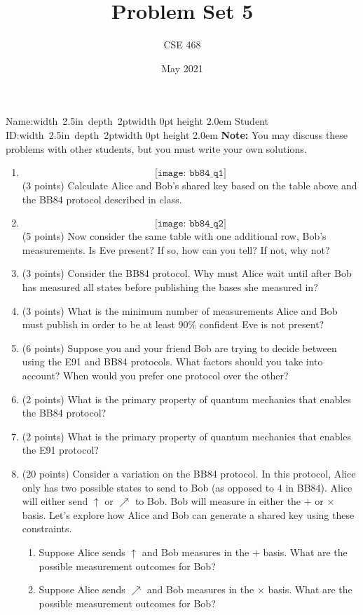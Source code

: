 \documentclass[12pt]{article}
\title{Problem Set 5}
\author{CSE 468}
\date{May 2021}
\newcommand{\NameBlank}{\mbox{\hskip 4pt\vrule width 2.5in depth 2pt}\vrule width 0pt height 2.0em}
\begin{document}
\maketitle

\noindent Name:\NameBlank{} \newline
\noindent Student ID:\NameBlank{} \newline
\textbf{Note:} You may discuss these problems with other students, but you must write your own solutions.

\begin{enumerate}[font=\bfseries]
    \item \[\texttt{[image: bb84\_q1]}\]
    (3 points) Calculate Alice and Bob's shared key based on the table above and the BB84 protocol described in class.
    \item \[\texttt{[image: bb84\_q2]}\]
    (5 points) Now consider the same table with one additional row, Bob's measurements. Is Eve present? If so, how can you tell? If not, why not?
    \item (3 points) Consider the BB84 protocol. Why must Alice wait until after Bob has measured all states before publishing the bases she measured in?
    \item (3 points) What is the minimum number of measurements Alice and Bob must publish in order to be at least 90\% confident Eve is not present?
    \item (6 points) Suppose you and your friend Bob are trying to decide between using the E91 and BB84 protocols. What factors should you take into account? When would you prefer one protocol over the other?
    \item (2 points) What is the primary property of quantum mechanics that enables the BB84 protocol?
    \item (2 points) What is the primary property of quantum mechanics that enables the E91 protocol?
    \item (20 points) Consider a variation on the BB84 protocol. In this protocol, Alice only has two possible states to send to Bob (as opposed to 4 in BB84). Alice will either send $\uparrow$ or $\nearrow$ to Bob. Bob will measure in either the $+$ or $\times$ basis. Let's explore how Alice and Bob can generate a shared key using these constraints.
        \begin{enumerate}
            \item Suppose Alice sends $\uparrow$ and Bob measures in the $+$ basis. What are the possible measurement outcomes for Bob?
            \item Suppose Alice sends $\nearrow$ and Bob measures in the $\times$ basis. What are the possible measurement outcomes for Bob?

\end{enumerate}
\end{enumerate}
\end{document}
